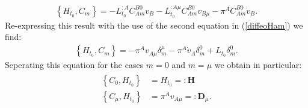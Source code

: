 \begin{align}
    \left \{H_{t_0}, C_m \right \} = -L_{t_0}^{:A} C_{Am}^{B0} v_B - L_{t_0}^{:A\mu} C_{Am}^{B0}v_{B \mu} - \pi^A C_{Am}^{B0} \dot{v}_B.
\end{align}
Re-expressing this result with the use of the second equation in (\ref{diffeoHam}) we find: 
\begin{align}
    \left \{H_{t_0}, C_m \right \} = -\pi^A v_{A\mu} \delta^{\mu}_m - \pi^A \dot{v}_A \delta^0_m + L_{t_0}\delta^0_m.
\end{align}
Seperating this equation for the cases $m=0$ and $m = \mu$ we obtain in particular:
\begin{align}
\begin{aligned}
    \left \{C_0 , H_{t_0}\right \} &= H_{t_0} =: \mathbf{H} \\
    \left \{C_{\mu} , H_{t_0}\right \} &= \pi^A v_{A\mu} =: \mathbf{D}_{\mu}.
\end{aligned}
\end{align}


